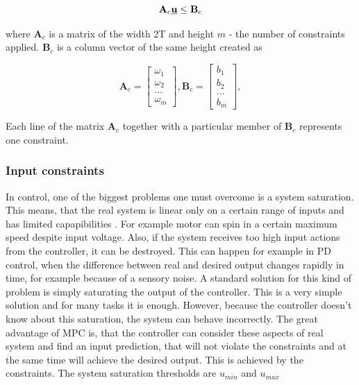 \documentclass{article}
\begin{document}
\begin{equation}
\label{eq:MPC_cond}
\textbf{A}_c \textbf{\underline{u}} \leq \textbf{B}_c
\end{equation}


where $\textbf{A}_c$ is a matrix of the width 2T and height $m$ - the number of constraints applied. $\textbf{B}_c$ is a column vector of the same height created as

\begin{equation}
\textbf{A}_c =
  \begin{bmatrix}
  \omega_1 \\
  \omega_2 \\
  ...	   \\
  \omega_m
  \end{bmatrix},\textbf{B}_c = \begin{bmatrix}
  b_1 \\
  b_2 \\
  ... \\
  b_m
  \end{bmatrix}, 
\end{equation}

Each line of the matrix $\textbf{A}_c$ together with a particular member of $\textbf{B}_c$ represents one constraint. 

\subsubsection{Input constraints}
\label{sec:input_constraints}
In control, one of the biggest problems one must overcome is a system saturation. This means, that the real system is linear only on a certain range of inputs and has limited capapibilities \cite{saturation}. For example motor can spin in a certain maximum speed despite input voltage. Also, if the system receives too high input actions from the controller, it can be destroyed. This can happen for example in PD control, when the difference between real and desired output changes rapidly in time, for example because of a sensory noise.
A standard  solution for this kind of problem is simply saturating the output of the controller. This is a very simple solution and for many tasks it is enough. However, because the controller doesn't know about this saturation, the system can behave incorrectly.
The great advantage of MPC is, that the controller can consider these aspects of real system and find an input prediction, that will not violate the constraints and at the same time will achieve the desired output. This is achieved by the constraints. The system saturation thresholds are $u_{min}$ and $u_{max}$
\end{document}
